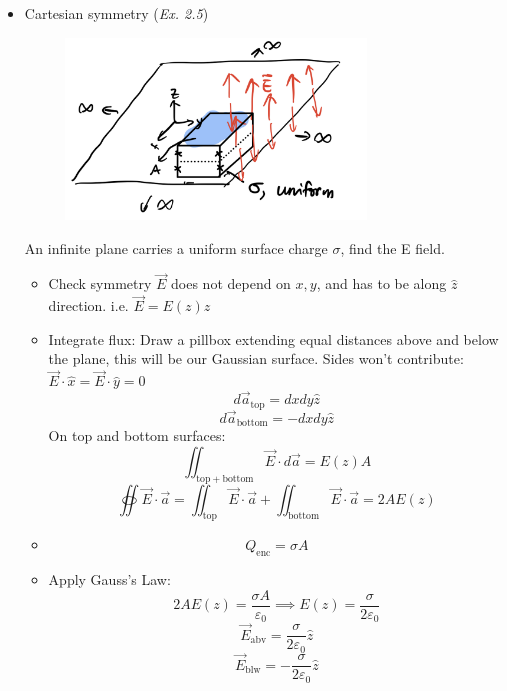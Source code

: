 \documentclass[12pt,a4paper,twoside]{article}
\numberwithin{equation}{section}
\begin{document}
\begin{itemize}
        \item Cartesian symmetry (\textit{Ex. 2.5})
            \begin{figure}[ht]
                \centering
                \includegraphics[width = 8cm]{250-Revision/gauss-cartesian.png}
            \end{figure}
            An infinite plane carries a uniform surface charge $\sigma$, find the E field.
            \begin{itemize}
                \item Check symmetry
                    \subitem $\overrightarrow{E}$ does not depend on $x, y$, and has to be along $\hat{z}$ direction. i.e. $\overrightarrow{E}=E(z)\hat{z}$
                \item Integrate flux:
                    \subitem Draw a pillbox extending equal distances above and below the plane, this will be our Gaussian surface.
                    \subitem Sides won't contribute: $\overrightarrow{E}\cdot \hat{x}=\overrightarrow{E}\cdot\hat{y}=0$
                    \[d\overrightarrow{a}_{\mathrm{top}}=dxdy\hat{z}\]
                    \[d\overrightarrow{a}_{\mathrm{bottom}}=-dxdy\hat{z}\]
                    \subitem On top and bottom surfaces:
                    \[\iint_{\mathrm{top+bottom}}\overrightarrow{E}\cdot d\overrightarrow{a}=E(z)A\] 
                    \[\oiint \overrightarrow{E}\cdot \overrightarrow{a}=\iint_{\mathrm{top}}\overrightarrow{E}\cdot \overrightarrow{a}+\iint_{\mathrm{bottom}}\overrightarrow{E}\cdot \overrightarrow{a}=2AE(z)\]
                \item
                \[Q_{\mathrm{enc}}=\sigma A\]
                \item Apply Gauss's Law:
                \[2AE(z)=\frac{\sigma A}{\varepsilon_0}\implies E(z)=\frac{\sigma }{2\varepsilon_0}\]
                \[\overrightarrow{E}_{\mathrm{abv}}=\frac{\sigma }{2\varepsilon_0}\hat{z}\]
                \[\overrightarrow{E}_{\mathrm{blw}}=-\frac{\sigma }{2\varepsilon_0}\hat{z}\]
            \end{itemize}
    \end{itemize}
\end{document}
